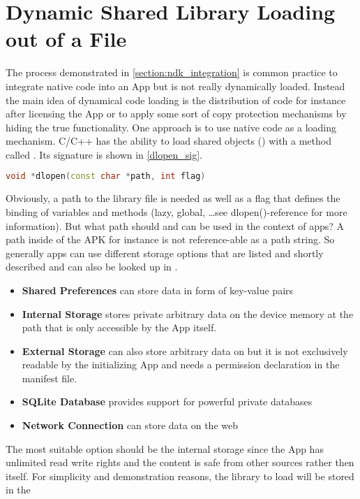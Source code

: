 \section{Dynamic Shared Library Loading out of a File}\label{section:shared_library_loading}
The process demonstrated in \autoref{section:ndk_integration} is common practice to
integrate native code into an App but is not really dynamically loaded. Instead
the main idea of dynamical code loading is the distribution of code for instance
after licensing the App or to apply some sort of copy protection mechanisms by hiding
the true functionality. One approach is to use native code as a loading mechanism.
C/C++ has the ability to load shared objects () with a method called
. Its signature is shown in \autoref{dlopen_sig}.
\begin{lstlisting}[language=C++, caption=dlopen() Signature, label=dlopen_sig]
void *dlopen(const char *path, int flag)
\end{lstlisting}
Obviously, a path to the library file is needed as well as a flag that defines the binding of variables and methods (lazy, global, \ldots see dlopen()-reference for more information).
But what path should and can be used in the context of apps? A path inside of the APK
for instance is not reference-able as a path string. So generally apps can use different storage options that are listed and shortly described and can also be looked up in
\parencite{storage_options}.
\begin{itemize}
\item \textbf{Shared Preferences} can store data in form of key-value pairs
\item \textbf{Internal Storage} stores private arbitrary data on the device memory at the path
  that is only accessible by the App itself.
\item \textbf{External Storage} can also store arbitrary data on  but it is not exclusively readable by the initializing App and needs a permission declaration in
the manifest file.
\item \textbf{SQLite Database} provides support for powerful private databases
\item \textbf{Network Connection} can store data on the web
\end{itemize}
The most suitable option should be the internal storage since the App has unlimited read
write rights and the content is safe from other sources rather then itself. For simplicity and demonstration reasons, the library to load will be stored in the
